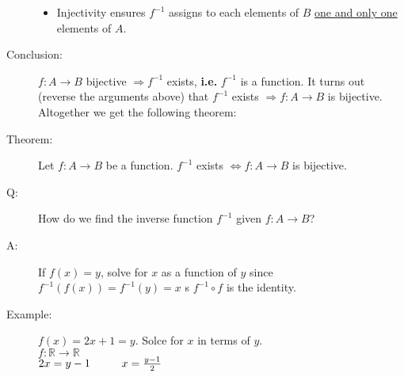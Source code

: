 \documentclass[10pt]{article}
\begin{document}
\begin{description}
\begin{itemize}
			\item Injectivity ensures $f^{-1}$ assigns to each elements of $B$ \underline{one and only one} elements of $A$.
		\end{itemize}
		\item[Conclusion:] $f:A \rightarrow B$ bijective $\Rightarrow f^{-1}$ exists, \textbf{i.e.} $f^{-1} $ is a function. It turns out (reverse the arguments above) that $f^{-1}$ exists $\Rightarrow f:A \rightarrow B$ is bijective. \\
		Altogether we get the following theorem:
		\item[Theorem:] Let $f:A \rightarrow B$ be a function. $f^{-1}$ exists $\Leftrightarrow f:A \rightarrow B$ is bijective.
		\item[Q:] How do we find the inverse function $f^{-1}$ given $f: A \rightarrow B$?
		\item[A:] If $f(x)=y$, solve for $x$ as a function of $y$ since $f^{-1}(f(x))=f^{-1}(y)=x$ s $f^{-1} \circ f$ is the identity.
		\item[Example:] $f(x)=2x+1=y$. Solce for $x$ in terms of $y$. \\
		$f: \mathbb{R} \rightarrow \mathbb{R}$ \\
		$2x = y-1 \hspace{10mm} x = \frac{y-1}{2}$
	\end{description}
	
\end{document}
